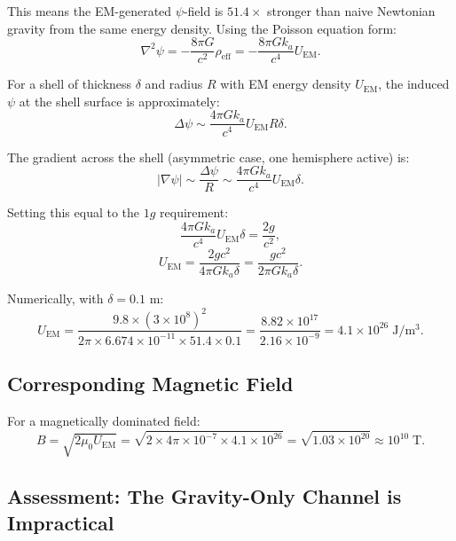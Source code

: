 \documentclass[12pt, letterpaper]{article}
\theoremstyle{definition}
\theoremstyle{remark}
\newcommand{\ka}{k_a}
\begin{document}
This means the EM-generated $\psi$-field is $51.4\times$ stronger than
naive Newtonian gravity from the same energy density. Using the Poisson
equation form:
\begin{equation}
\nabla^2 \psi = -\frac{8\pi G}{c^2} \rho_{\mathrm{eff}}
= -\frac{8\pi G \ka}{c^4} U_{\mathrm{EM}}.
\end{equation}

For a shell of thickness $\delta$ and radius $R$ with EM energy density
$U_{\mathrm{EM}}$, the induced $\psi$ at the shell surface is approximately:
\begin{equation}
\Delta\psi \sim \frac{4\pi G \ka}{c^4} U_{\mathrm{EM}} R \delta.
\end{equation}

The gradient across the shell (asymmetric case, one hemisphere active) is:
\begin{equation}
|\nabla\psi| \sim \frac{\Delta\psi}{R}
\sim \frac{4\pi G \ka}{c^4} U_{\mathrm{EM}} \delta.
\end{equation}

Setting this equal to the $1g$ requirement:
\begin{equation}
\frac{4\pi G \ka}{c^4} U_{\mathrm{EM}} \delta = \frac{2g}{c^2},
\end{equation}
\begin{equation}
U_{\mathrm{EM}} = \frac{2g c^2}{4\pi G \ka \delta}
= \frac{g c^2}{2\pi G \ka \delta}.
\end{equation}

Numerically, with $\delta = 0.1$ m:
\begin{equation}
U_{\mathrm{EM}} = \frac{9.8 \times (3 \times 10^8)^2}{2\pi \times 6.674 \times 10^{-11} \times 51.4 \times 0.1}
= \frac{8.82 \times 10^{17}}{2.16 \times 10^{-9}}
= 4.1 \times 10^{26} \; \mathrm{J/m^3}.
\end{equation}

\subsection{Corresponding Magnetic Field}

For a magnetically dominated field:
\begin{equation}
B = \sqrt{2\mu_0 U_{\mathrm{EM}}}
= \sqrt{2 \times 4\pi \times 10^{-7} \times 4.1 \times 10^{26}}
= \sqrt{1.03 \times 10^{20}}
\approx 10^{10} \; \mathrm{T}.
\end{equation}

\subsection{Assessment: The Gravity-Only Channel is Impractical}
\end{document}
